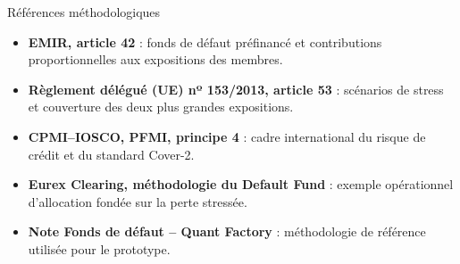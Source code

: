 \documentclass[10pt,aspectratio=169]{beamer}
\begin{document}
\begin{frame}{Références méthodologiques}
  \begin{itemize}
    \item \textbf{EMIR, article 42} : fonds de défaut préfinancé et
      contributions proportionnelles aux expositions des membres.
    \item \textbf{Règlement délégué (UE) nº 153/2013, article 53} :
      scénarios de stress et couverture des deux plus grandes expositions.
    \item \textbf{CPMI--IOSCO, PFMI, principe 4} :
      cadre international du risque de crédit et du standard Cover-2.
    \item \textbf{Eurex Clearing, méthodologie du Default Fund} :
      exemple opérationnel d'allocation fondée sur la perte stressée.
    \item \textbf{Note Fonds de défaut -- Quant Factory} :
      méthodologie de référence utilisée pour le prototype.
  \end{itemize}

\end{frame}
\end{document}

